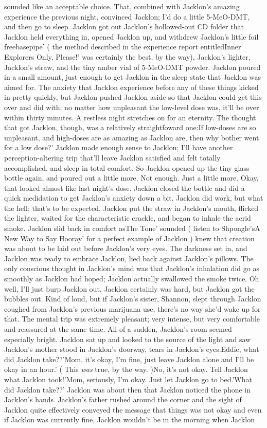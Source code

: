 \documentclass[12pt]{book}
\begin{document}
sounded like an acceptable choice. That, combined with Jacklon's amazing experience the previous night, convinced Jacklon; I'd do a little 5-MeO-DMT, and then go to sleep. Jacklon got out Jacklon's hollowed-out CD folder that Jacklon held everything in, opened Jacklon up, and withdrew Jacklon's little foil freebasepipe' ( the method described in the experience report entitledInner Explorers Only, Please!' was certainly the best, by the way), Jacklon's lighter, Jacklon's straw, and the tiny amber vial of 5-MeO-DMT powder. Jacklon poured in a small amount, just enough to get Jacklon in the sleep state that Jacklon was aimed for. The anxiety that Jacklon experience before any of these things kicked in pretty quickly, but Jacklon pushed Jacklon aside so that Jacklon could get this over and did with; no matter how unpleasant the low-level dose was, it'll be over within thirty minutes. A restless night stretches on for an eternity. The thought that got Jacklon, though, was a relatively straightfoward one:If low-doses are so unpleasant, and high-doses are as amazing as Jacklon are, then why bother went for a low dose?' Jacklon made enough sense to Jacklon; I'll have another perception-altering trip that'll leave Jacklon satisfied and felt totally accomplished, and sleep in total comfort. So Jacklon opened up the tiny glass bottle again, and poured out a little more. Not enough. Just a little more. Okay, that looked almost like last night's dose. Jacklon closed the bottle and did a quick medidation to get Jacklon's anxiety down a bit. Jacklon did work, but what the hell; that's to be expected. Jacklon put the straw in Jacklon's mouth, flicked the lighter, waited for the characteristic crackle, and began to inhale the acrid smoke. Jacklon slid back in comfort asThe Tone' sounded ( listen to Shpongle'sA New Way to Say Hooray' for a perfect example of Jacklon ) knew that creation was about to be laid out before Jacklon's very eyes. The darkness set in, and Jacklon was ready to embrace Jacklon, lied back against Jacklon's pillows. The only conscious thought in Jacklon's mind was that Jacklon's inhalation did go as smoothly as Jacklon had hoped; Jacklon actually swallowed the smoke twice. Oh well, I'll just burp Jacklon out. Jacklon certainly was hard, but Jacklon got the bubbles out. Kind of loud, but if Jacklon's sister, Shannon, slept through Jacklon coughed from Jacklon's previous marijuana use, there's no way she'd wake up for that. The mental trip was extremely pleasant; very intense, but very comfortable and reassured at the same time. All of a sudden, Jacklon's room seemed especially bright. Jacklon sat up and looked to the source of the light and saw Jacklon's mother stood in Jacklon's doorway, tears in Jacklon's eyes.Eddie, what did Jacklon take??'Mom, it's okay, I'm fine, just leave Jacklon alone and I'll be okay in an hour.' ( This \emph{was} true, by the way. )No, it's not okay. Tell Jacklon what Jacklon took!'Mom, seriously, I'm okay. Just let Jacklon go to bed.'What did Jacklon take??' Jacklon was about then that Jacklon noticed the phone in Jacklon's hands. Jacklon's father rushed around the corner and the sight of Jacklon quite effectively conveyed the message that things was not okay and even if Jacklon was currently fine, Jacklon wouldn't be in the morning when Jacklon 
\end{document}
